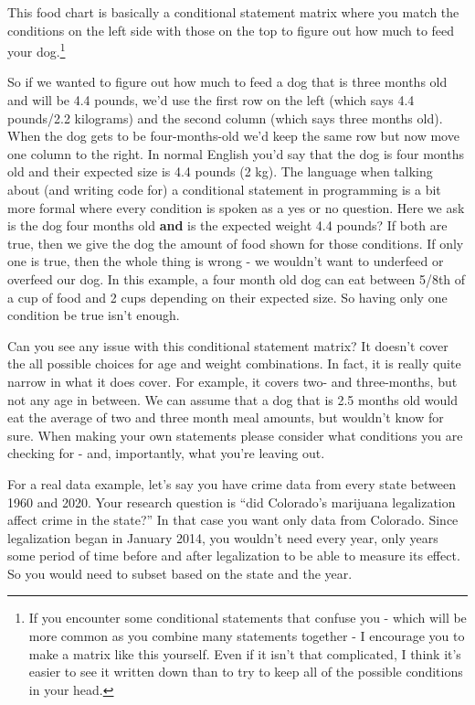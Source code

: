 \documentclass[
  a4paper,
]{krantz}
\begin{document}
This food chart is basically a conditional statement matrix
where you match the conditions on the left side with those
on the top to figure out how much to feed your
dog.\footnote{If you encounter some conditional statements
  that confuse you - which will be more common as you
  combine many statements together - I encourage you to make
  a matrix like this yourself. Even if it isn't that
  complicated, I think it's easier to see it written down
  than to try to keep all of the possible conditions in your
  head.}

So if we wanted to figure out how much to feed a dog that is
three months old and will be 4.4 pounds, we'd use the first
row on the left (which says 4.4 pounds/2.2 kilograms) and
the second column (which says three months old). When the
dog gets to be four-months-old we'd keep the same row but
now move one column to the right. In normal English you'd
say that the dog is four months old and their expected size
is 4.4 pounds (2 kg). The language when talking about (and
writing code for) a conditional statement in programming is
a bit more formal where every condition is spoken as a yes
or no question. Here we ask is the dog four months old
\textbf{and} is the expected weight 4.4 pounds? If both are
true, then we give the dog the amount of food shown for
those conditions. If only one is true, then the whole thing
is wrong - we wouldn't want to underfeed or overfeed our
dog. In this example, a four month old dog can eat between
5/8th of a cup of food and 2 cups depending on their
expected size. So having only one condition be true isn't
enough.

Can you see any issue with this conditional statement
matrix? It doesn't cover the all possible choices for age
and weight combinations. In fact, it is really quite narrow
in what it does cover. For example, it covers two- and
three-months, but not any age in between. We can assume that
a dog that is 2.5 months old would eat the average of two
and three month meal amounts, but wouldn't know for sure.
When making your own statements please consider what
conditions you are checking for - and, importantly, what
you're leaving out.

For a real data example, let's say you have crime data from
every state between 1960 and 2020. Your research question is
``did Colorado's marijuana legalization affect crime in the
state?'' In that case you want only data from Colorado.
Since legalization began in January 2014, you wouldn't need
every year, only years some period of time before and after
legalization to be able to measure its effect. So you would
need to subset based on the state and the year.
\end{document}

